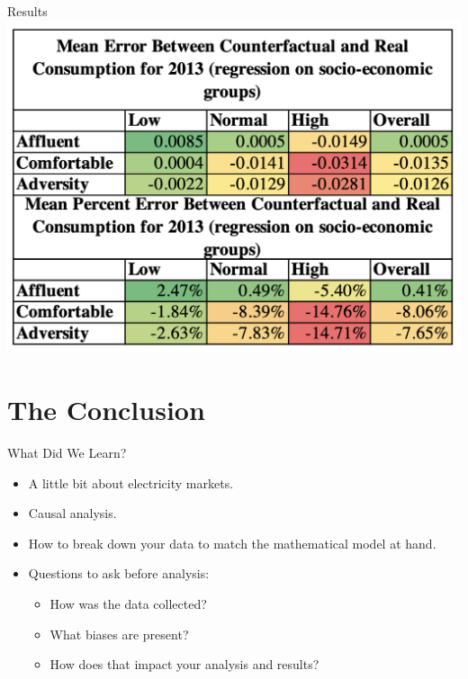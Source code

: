 \documentclass{beamer}
\begin{document}
\begin{frame}{Results}
  \centering
  \includegraphics[width=1\textwidth]{images/agg-linreg-consumption2.png}
\end{frame}

\section{The Conclusion}

\begin{frame}{What Did We Learn?}
  \begin{itemize}
    \item<+-> A little bit about electricity markets.
    \item<+-> Causal analysis.
    \item<+-> How to break down your data to match the mathematical model at hand.
    \item<+-> Questions to ask before analysis:
    \begin{itemize}
      \item<+-> How was the data collected? 
      \item<+-> What biases are present?
      \item<+-> How does that impact your analysis and results?
    \end{itemize}
  \end{itemize}
\end{frame}
\end{document}
